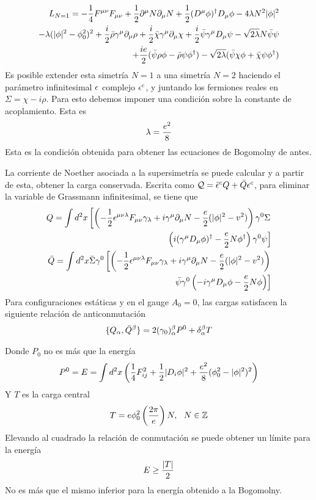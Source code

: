 \documentclass[11pt,t]{beamer}
\begin{document}
\begin{frame}
\begin{align*}
L_{N=1} = -\frac{1}{4} F^{\mu\nu}F_{\mu\nu}+\frac{1}{2}\partial^\mu N\partial_\mu N+\frac{1}{2}(D^\mu\phi)^\dagger D_\mu\phi-4\lambda N^2|\phi|^2\\
-\lambda(|\phi|^2-\phi_0^2)^2+\frac{i}{2}\bar\rho\gamma^\mu\partial_\mu\rho+\frac{i}{2}\bar\chi\gamma^\mu\partial_\mu\chi+\frac{i}{2}\bar\psi\gamma^\mu D_\mu\psi-\sqrt{2\lambda}N\bar\psi\psi\\
+\frac{ie}{2}(\bar\psi\rho\phi-\bar\rho\psi\phi^\dagger)-\sqrt{2\lambda}(\bar\psi\chi\phi+\bar\chi\psi\phi^\dagger)
\end{align*}
Es posible extender esta simetría $N=1$ a una simetría $N=2$ haciendo el parámetro infinitesimal $\epsilon$ complejo $\epsilon^c$, y juntando los fermiones reales en $\Sigma=\chi-i\rho$. Para esto debemos imponer una condición sobre la constante de acoplamiento. Esta es
\begin{align}
\lambda = \frac{e^2}{8}
\end{align}
Esta es la condición obtenida para obtener las ecuaciones de Bogomolny de antes.
\end{frame}

\begin{frame}
La corriente de Noether asociada a la supersimetría se puede calcular y a partir de esta, obtener la carga conservada. Escrita como $\mathcal{Q}=\bar{\epsilon}^c Q+\bar Q\epsilon^c$, para eliminar la variable de Grassmann infinitesimal, se tiene que
\begin{align*}
Q = \int d^2x\left[\left(-\frac{1}{2}\epsilon^{\mu\nu\lambda}F_{\mu\nu}\gamma_\lambda+i\gamma^\mu\partial_\mu N-\frac{e}{2}(|\phi|^2-v^2)\right)\gamma^0\Sigma\right.\\
\left.\left(i(\gamma^\mu D_\mu\phi)^\dagger-\frac{e}{2}N\phi^\dagger\right)\gamma^0\psi\right]\\
\bar Q = \int d^2x\bar\Sigma\gamma^0\left[\left(-\frac{1}{2}\epsilon^{\mu\nu\lambda}F_{\mu\nu}\gamma_\lambda+i\gamma^\mu\partial_\mu N-\frac{e}{2}(|\phi|^2-v^2)\right)\right.\\
\left.\bar\psi\gamma^0\left(-i\gamma^\mu D_\mu\phi-\frac{e}{2}N\phi\right)\right]
\end{align*}
Para configuraciones estáticas y en el gauge $A_0=0$, las cargas satisfacen la siguiente relación de anticonmutación
\begin{align}
\{Q_\alpha,\bar Q^\beta\}=2(\gamma_0)^\beta_\alpha P^0+\delta^\beta_\alpha T
\end{align}

\end{frame}

\begin{frame}
Donde $P_0$ no es más que la energía
\begin{align}
P^0 = E = \int d^2x\left(\frac{1}{4} F_{ij}^2+\frac{1}{2}|D_i\phi|^2+\frac{e^2}{8}(\phi_0^2-|\phi|^2)^2\right)
\end{align}
Y $T$ es la carga central
\begin{align}
T = e\phi_0^2\left(\frac{2\pi}{e}\right)N, \ \ N\in\mathbb{Z}
\end{align}
Elevando al cuadrado la relación de conmutación se puede obtener un límite para la energía
\begin{align}
E\geq\frac{|T|}{2}
\end{align}
No es más que el mismo inferior para la energía obtenido a la Bogomolny.
\end{frame}
\end{document}
